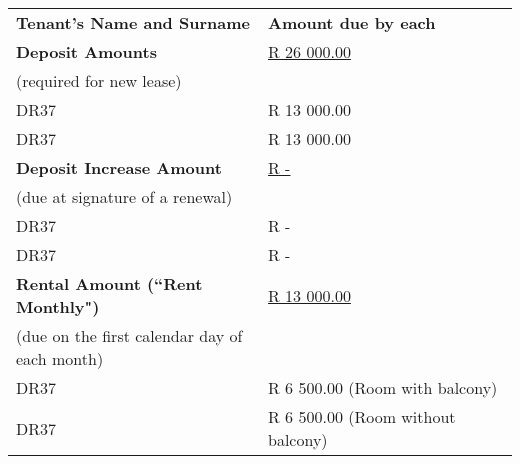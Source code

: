 \documentclass[11pt]{article}
\begin{document}
\begin{table}[ht]
	\centering
	\begin{tabular}{p{0.5\linewidth}p{0.5\linewidth}}
		\hspace{6em} \textbf{Tenant's Name and Surname} & \textbf{Amount due by each}\\
		\textbf{Deposit Amounts} \label{input:deposit} & \underline{R 26 000.00 \hspace{3em}}\\
		\small{(required for new lease)} \\
		DR37 \underline{\hspace{20em}} & R 13 000.00 \\
		DR37 \underline{\hspace{20em}} & R 13 000.00 \\ [0.5cm]

		\textbf{Deposit Increase Amount} \label{input:deposit-top-up} & \underline{R - \hspace{3em}}\\
		\small{(due at signature of a renewal)} \\
		DR37 \underline{\hspace{20em}} & R - \\
		DR37 \underline{\hspace{20em}} & R - \\ [0.5cm]

		\textbf{Rental Amount (``Rent Monthly")} \label{input:rent-amount} & \underline{R 13 000.00 \hspace{3em}}\\
		\small{(due on the first calendar day of each month)} \\
		DR37 \underline{\hspace{20em}} & R 6 500.00 \hspace{3em} (Room with balcony) \\
		DR37 \underline{\hspace{20em}} & R 6 500.00 \hspace{3em} (Room without balcony) \\[0.5cm]


\end{tabular}
\end{table}
\end{document}

